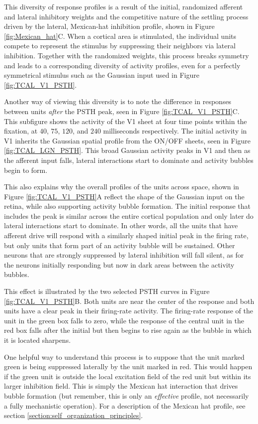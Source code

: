 \documentclass[phd,ianc,twoside]{infthesis}
\begin{document}
This diversity of response profiles is a result of the initial,
randomized afferent and lateral inhibitory weights and the competitive
nature of the settling process driven by the lateral, Mexican-hat
inhibition profile, shown in Figure \ref{fig:Mexican_hat}C. When a cortical area is stimulated, the individual
units compete to represent the stimulus by suppressing their neighbors
via lateral inhibition. Together with the randomized weights, this process
breaks symmetry and leads to a corresponding diversity of activity
profiles, even for a perfectly symmetrical stimulus such as the Gaussian
input used in Figure \ref{fig:TCAL_V1_PSTH}.

Another way of viewing this diversity is to note the difference in
responses between units \emph{after} the PSTH peak, seen in Figure
\ref{fig:TCAL_V1_PSTH}C. This subfigure shows the activity of the V1
sheet at four time points within the fixation, at $40$, $75$, $120$, and
$240$ milliseconds respectively. The initial activity in V1 inherits the
Gaussian spatial profile from the ON/OFF sheets, seen in Figure
\ref{fig:TCAL_LGN_PSTH}. This broad Gaussian activity peaks in V1 and
then as the afferent input falls, lateral interactions start to dominate
and activity bubbles begin to form.

This also explains why the overall profiles of the units across space,
shown in Figure \ref{fig:TCAL_V1_PSTH}A reflect the shape of the
Gaussian input on the retina, while also supporting activity bubble
formation. The initial response that includes the peak is similar across
the entire cortical population and only later do lateral interactions
start to dominate. In other words, all the units that have afferent
drive will respond with a similarly shaped initial peak in the firing
rate, but only units that form part of an activity bubble will be
sustained. Other neurons that are strongly suppressed by lateral
inhibition will fall silent, as for the neurons initially responding
but now in dark areas between the activity bubbles.

This effect is illustrated by the two selected PSTH curves in Figure
\ref{fig:TCAL_V1_PSTH}B. Both units are near the center of the response
and both units have a clear peak in their firing-rate activity. The
firing-rate response of the unit in the green box falls to zero, while
the response of the central unit in the red box falls after the initial
but then begins to rise again as the bubble in which it is located sharpens.

One helpful way to understand this process is to suppose that the unit
marked green is being suppressed laterally by the unit marked in
red. This would happen if the green unit is outside the local excitation
field of the red unit but within its larger inhibition field. This is
simply the Mexican hat interaction that drives bubble formation (but
remember, this is only an \emph{effective} profile, not necessarily a
fully mechanistic operation). For a description of the Mexican hat
profile, see section \ref{section:self_organization_principles}.
\end{document}
